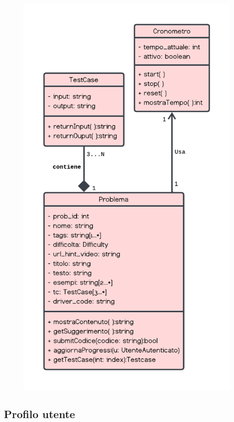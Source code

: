 \documentclass[11pt, a4paper]{article}
\theoremstyle{definition} %
\begin{document}
\begin{figure}[H]
\centering
\includegraphics[scale = 0.8]{materiale/class-esercitazione.pdf}
\caption{}
\label{esercitaz}
\end{figure}


\newpage
\subsection{Profilo utente}
\end{document}
